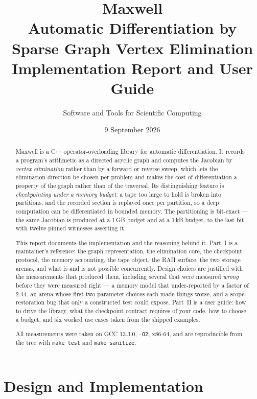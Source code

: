 \documentclass[11pt,a4paper]{report}
\title{\vspace{-2cm}\Huge Maxwell\\[0.3cm]
\Large Automatic Differentiation by Sparse Graph Vertex Elimination\\[0.6cm]
\large Implementation Report and User Guide}
\author{Software and Tools for Scientific Computing}
\date{9 September 2026}
\newcommand{\code}[1]{\texttt{#1}}
\begin{document}
\maketitle

\begin{abstract}
\noindent
Maxwell is a C\texttt{++} operator-overloading library for automatic
differentiation. It records a program's arithmetic as a directed acyclic graph
and computes the Jacobian by \emph{vertex elimination} rather than by a forward
or reverse sweep, which lets the elimination direction be chosen per problem
and makes the cost of differentiation a property of the graph rather than of
the traversal. Its distinguishing feature is \emph{checkpointing under a memory
budget}: a tape too large to hold is broken into partitions, and the recorded
section is replayed once per partition, so a deep computation can be
differentiated in bounded memory. The partitioning is bit-exact --- the same
Jacobian is produced at a 1\,GB budget and at a 1\,kB budget, to the last bit,
with twelve pinned witnesses asserting it.

This report documents the implementation and the reasoning behind it. Part~I is
a maintainer's reference: the graph representation, the elimination core, the
checkpoint protocol, the memory accounting, the tape object, the RAII surface,
the two storage arenas, and what is and is not possible concurrently. Design
choices are justified with the measurements that produced them, including
several that were measured \emph{wrong} before they were measured right ---
a memory model that under-reported by a factor of $2.44$, an arena whose first
two parameter choices each made things worse, and a scope-restoration bug that
only a constructed test could expose. Part~II is a user guide: how to drive the
library, what the checkpoint contract requires of your code, how to choose a
budget, and six worked use cases taken from the shipped examples.

\vspace{0.4cm}
\noindent
All measurements were taken on GCC 13.3.0, \code{-O2}, x86-64, and are
reproducible from the tree with \code{make test} and \code{make sanitize}.
\end{abstract}

\tableofcontents

\part{Design and Implementation}
\end{document}
